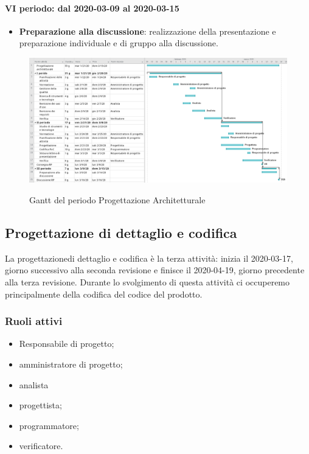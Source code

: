 \paragraph*{VI periodo: dal 2020-03-09 al 2020-03-15}
\begin{itemize}
	\item \textbf{Preparazione alla discussione}: realizzazione della presentazione e preparazione individuale e di gruppo alla discussione.
\end{itemize}

\begin{landscape}
	\begin{figure}[H] 	
		\includegraphics[width=\linewidth]{./gantt/Progettazione_architetturale_datax2.png}	\\
		\caption{Gantt del periodo Progettazione Architetturale}	
	\end{figure}
\end{landscape}


\subsection{Progettazione di dettaglio e codifica}
La progettazione\glosp di dettaglio e codifica è la terza attività: inizia il 2020-03-17, giorno successivo alla seconda revisione e finisce il 2020-04-19, giorno precedente alla terza revisione. Durante lo svolgimento di questa attività ci occuperemo principalmente della codifica del codice del prodotto\glo.

\subsubsection{Ruoli attivi}
\begin{itemize}
	\item Responsabile di progetto\glo;
	\item amministratore di progetto\glo;
	\item analista
	\item progettista;
	\item programmatore;
	\item verificatore.
\end{itemize}


